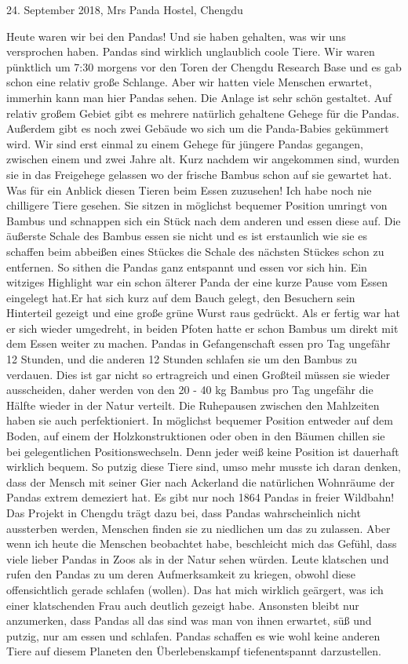 \documentclass[11pt]{book}
\begin{document}
24. September 2018, Mrs Panda Hostel, Chengdu

Heute waren wir bei den Pandas! Und sie haben gehalten, was wir uns versprochen haben. Pandas sind wirklich 
unglaublich coole Tiere. Wir waren pünktlich um 7:30 morgens vor den Toren der Chengdu Research Base und es 
gab schon eine relativ große Schlange. Aber wir hatten viele Menschen erwartet, immerhin kann man hier Pandas sehen.
Die Anlage ist sehr schön gestaltet. Auf relativ großem Gebiet gibt es mehrere natürlich gehaltene Gehege für 
die Pandas. Außerdem gibt es noch zwei Gebäude wo sich um die Panda-Babies gekümmert wird. Wir sind erst einmal 
zu einem Gehege für jüngere Pandas gegangen, zwischen einem und zwei Jahre alt. Kurz nachdem wir angekommen sind, 
wurden sie in das Freigehege gelassen wo der frische Bambus schon auf sie gewartet hat. Was für ein Anblick diesen 
Tieren beim Essen zuzusehen! Ich habe noch nie chilligere Tiere gesehen. Sie sitzen in möglichst bequemer Position 
umringt von Bambus und schnappen sich ein Stück nach dem anderen und essen diese auf. Die äußerste Schale des Bambus 
essen sie nicht und es ist erstaunlich wie sie es schaffen beim abbeißen eines Stückes die Schale des nächsten 
Stückes schon zu entfernen. So sithen die Pandas ganz entspannt und essen vor sich hin. Ein witziges Highlight 
war ein schon älterer Panda der eine kurze Pause vom Essen eingelegt hat.Er hat sich kurz auf dem Bauch gelegt, 
den Besuchern sein Hinterteil gezeigt und eine große grüne Wurst raus gedrückt. Als er fertig war hat er sich wieder 
umgedreht, in beiden Pfoten hatte er schon Bambus um direkt mit dem Essen weiter zu machen. Pandas in Gefangenschaft 
essen pro Tag ungefähr 12 Stunden, und die anderen 12 Stunden schlafen sie um den Bambus zu verdauen. Dies ist gar 
nicht so ertragreich und einen Großteil müssen sie wieder ausscheiden, daher werden von den 20 - 40 kg Bambus pro Tag
ungefähr die Hälfte wieder in der Natur verteilt. Die Ruhepausen zwischen den Mahlzeiten haben sie auch perfektioniert. 
In möglichst bequemer Position entweder auf dem Boden, auf einem der Holzkonstruktionen oder oben in den Bäumen 
chillen sie bei gelegentlichen Positionswechseln. Denn jeder weiß keine Position ist dauerhaft wirklich bequem. 
So putzig diese Tiere sind, umso mehr musste ich daran denken, dass der Mensch mit seiner Gier nach Ackerland die 
natürlichen Wohnräume der Pandas extrem demeziert hat. Es gibt nur noch 1864 Pandas in freier Wildbahn! Das Projekt 
in Chengdu trägt dazu bei, dass Pandas wahrscheinlich nicht aussterben werden, Menschen finden sie zu niedlichen um das 
zu zulassen. Aber wenn ich heute die Menschen beobachtet habe, beschleicht mich das Gefühl, dass viele lieber Pandas 
in Zoos als in der Natur sehen würden. Leute klatschen und rufen den Pandas zu um deren Aufmerksamkeit zu kriegen, 
obwohl diese offensichtlich gerade schlafen (wollen). Das hat mich wirklich geärgert, was ich einer klatschenden 
Frau auch deutlich gezeigt habe. Ansonsten bleibt nur anzumerken, dass Pandas all das sind was man von ihnen erwartet, 
süß und putzig, nur am essen und schlafen. Pandas schaffen es wie wohl keine anderen Tiere auf diesem Planeten 
den Überlebenskampf tiefenentspannt darzustellen.
\end{document}
